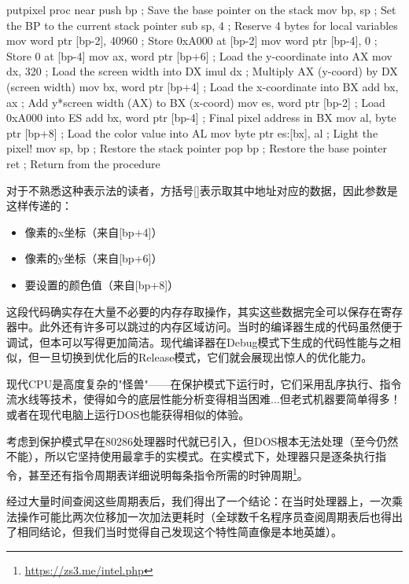 \begin{shell}
putpixel proc near
  push bp ; Save the base pointer on the stack
  mov bp, sp ; Set the BP to the current stack pointer
  sub sp, 4 ; Reserve 4 bytes for local variables
  mov word ptr [bp-2], 40960 ; Store 0xA000 at [bp-2]
  mov word ptr [bp-4], 0 ; Store 0 at [bp-4]
  mov ax, word ptr [bp+6] ; Load the y-coordinate into AX
  mov dx, 320 ; Load the screen width into DX
  imul dx ; Multiply AX (y-coord) by DX (screen width)
  mov bx, word ptr [bp+4] ; Load the x-coordinate into BX
  add bx, ax ; Add y*screen width (AX) to BX (x-coord)
  mov es, word ptr [bp-2] ; Load 0xA000 into ES
  add bx, word ptr [bp-4] ; Final pixel address in BX
  mov al, byte ptr [bp+8] ; Load the color value into AL
  mov byte ptr es:[bx], al ; Light the pixel!
  mov sp, bp ; Restore the stack pointer
  pop bp ; Restore the base pointer
  ret ; Return from the procedure
\end{shell}

对于不熟悉这种表示法的读者，方括号[]表示取其中地址对应的数据，因此参数是这样传递的：

\begin{itemize}
\item 
像素的x坐标（来自[bp+4]）

\item 
像素的y坐标（来自[bp+6]） 

\item 
要设置的颜色值（来自[bp+8]）
\end{itemize}

这段代码确实存在大量不必要的内存存取操作，其实这些数据完全可以保存在寄存器中。此外还有许多可以跳过的内存区域访问。当时的编译器生成的代码虽然便于调试，但本可以写得更加简洁。现代编译器在Debug模式下生成的代码性能与之相似，但一旦切换到优化后的Release模式，它们就会展现出惊人的优化能力。

现代CPU是高度复杂的"怪兽"——在保护模式下运行时，它们采用乱序执行、指令流水线等技术，使得如今的底层性能分析变得相当困难...但老式机器要简单得多！或者在现代电脑上运行DOS也能获得相似的体验。

考虑到保护模式早在80286处理器时代就已引入，但DOS根本无法处理（至今仍然不能），所以它坚持使用最拿手的实模式。在实模式下，处理器只是逐条执行指令，甚至还有指令周期表详细说明每条指令所需的时钟周期\footnote{\url{https://zs3.me/intel.php}}。

经过大量时间查阅这些周期表后，我们得出了一个结论：在当时处理器上，一次乘法操作可能比两次位移加一次加法更耗时（全球数千名程序员查阅周期表后也得出了相同结论，但我们当时觉得自己发现这个特性简直像是本地英雄）。

